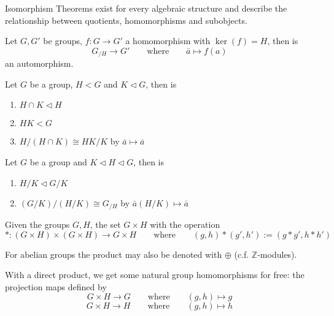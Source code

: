 Isomorphism Theorems exist for every algebraic structure and describe the relationship between quotients, homomorphisms and subobjects.
\begin{proposition}
   Let \(G, G'\) be groups, \(f: G \to G'\) a homomorphism with \(\ker(f) = H\), then is
   \[G_{/H} \to G' \qquad\text{where}\qquad \bar{a} \mapsto f(a)\]
   an automorphism.
\end{proposition}

\begin{proposition}
   Let \(G\) be a group, \(H < G\) and \(K \triangleleft G\), then is
   \begin{enumerate}[label=\roman*, align=Center]
      \item \(H \cap K \triangleleft H\)
      \item \(HK < G\)
      \item \(H/(H \cap K) \cong HK/K\) by \(\bar{a} \mapsto \bar{a}\)
   \end{enumerate}
\end{proposition}

\begin{proposition}
   Let \(G\) be a group and \(K \triangleleft H \triangleleft G\), then is
   \begin{enumerate}[label=\roman*, align=Center]
      \item \(H/K \triangleleft G/K\)
      \item \((G/K)/(H/K) \cong G_{/H}\) by \(\bar{a}(H/K) \mapsto \bar{a}\)
   \end{enumerate}
\end{proposition}

\begin{definition}
   Given the groups \(G, H\), the set \(G \times H\) with the operation
   \[\ast: (G \times H) \times (G \times H) \to G \times H \qquad\text{where}\qquad (g, h) \ast (g', h') := (g \ast g', h \ast h')\]
\end{definition}
\begin{remark}[Notation]
   For abelian groups the product may also be denoted with \(\oplus\) (c.f. \(\mathbb{Z}\)-modules).
\end{remark}
\begin{remark}
   With a direct product, we get some natural group homomorphisms for free: the projection maps defined by
   \[G \times H \to G \qquad \text{where}\qquad (g, h) \mapsto g\]
   \[G \times H \to H \qquad \text{where}\qquad (g, h) \mapsto h\]
\end{remark}


